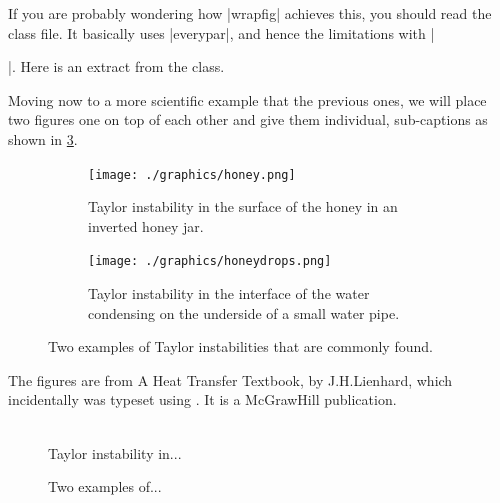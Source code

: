 \begin{teX}
\captionsetup[wrapfigure]{<options>}
\end{teX}

If you are probably wondering how |wrapfig| achieves this, you should read the class file. It basically uses |everypar|, and hence the limitations with |\par|. Here is an extract from the class.

\begin{teX}

\def\WF@startfloating{%
 \WF@everypar\expandafter{\the\everypar}\let\everypar\WF@everypar
 \WF@@everypar{\ifvoid\WF@box\else\WF@floathand\fi \the\everypar
 \WF@wraphand
}}
\end{teX}

Moving now to a more scientific example that the previous ones, we will place two figures
one on top of each other and give them individual, sub-captions as shown in \ref{fig:honey}.
 
\captionsetup[figure]{margin=10pt,font=small,labelfont=bf,format=hang}%

\begin{figure}[htbp]
\centering
  \begin{subfigure}[b]{0.5\textwidth}
  \texttt{[image: ./graphics/honey.png]}
  \caption{Taylor instability in the surface of the honey in an inverted honey jar.}\label{fig:honey}
    \hspace{1cm}
  \end{subfigure}

  \begin{subfigure}[b]{0.9\textwidth}
     \centering
     \texttt{[image: ./graphics/honeydrops.png]}
     \caption{Taylor instability in the interface of the water condensing on the underside of a small water pipe.}
  \end{subfigure}  
  \caption{Two examples of Taylor instabilities that are commonly found.}%
    \label{fig:Athird}%
\end{figure}

The figures are from A Heat Transfer Textbook, by J.H.Lienhard, which incidentally was typeset using
\tex . It is a McGrawHill publication. 

\begin{teX}
\begin{figure}[htbp]
    \captionsetup[figure]{margin=10pt}%
    \hspace{1cm}
     \\[-10pt]
   \caption{Taylor instability in...}%
    \label{fig:Afirst}%
    \caption{Two examples of... }%
    \label{fig:honey}%
\end{figure}
\end{teX}


